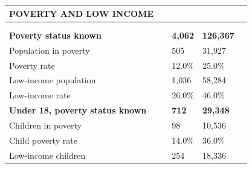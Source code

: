 \documentclass[9pt]{report}
\begin{document}
\vspace{12pt}
\setlength{\tabcolsep}{.01in} %
\begin{tabular}{p{.10in}p{.10in}p{.10in}p{3.7in}>{\hfill}p{.85in}>{\hfill}p{.85in}>{\hfill}p{.85in}>{\hfill}p{.85in}p{0.1in}}
\multicolumn{9}{l}{\parbox{7.1in}{\raggedright{\large{\strut\textbf{POVERTY AND LOW INCOME}\strut}}}} \\ 
\hline
\multicolumn{4}{l}{\parbox{3.5in}{\raggedright{\textbf{}}}} & \multicolumn{1}{r}{\parbox{.85in}{\strut\raggedleft{\textbf{}\strut}}} & \multicolumn{1}{r}{\parbox{.85in}{\strut\raggedleft{\textbf{}\strut}}} & \multicolumn{1}{r}{\parbox{.85in}{\strut{}}} & \multicolumn{1}{r}{\parbox{.85in}{\strut{}}} & \\ 
\multicolumn{9}{l}{} \\ 
\multicolumn{4}{l}{\parbox{3.5in}{\strut\raggedright{\textbf{Poverty status known}\strut}}} & \textbf{} & \textbf{} & \textbf{4,062} & \textbf{126,367} & \textbf{} \\ 
\multicolumn{4}{l}{\parbox{3.6in}{\strut\raggedright{{Population in poverty}}\strut}} &  &  & 505 & 31,927 & \multicolumn{1}{l}{}  \\ 
\multicolumn{4}{l}{\parbox{3.6in}{\strut\raggedright{{Poverty rate}}\strut}} &  &  & 12.0\% & 25.0\% & \multicolumn{1}{l}{}  \\ 
\multicolumn{4}{l}{\parbox{3.6in}{\strut\raggedright{{Low-income population}}\strut}} &  &  & 1,036 & 58,284 & \multicolumn{1}{l}{}  \\ 
\multicolumn{4}{l}{\parbox{3.6in}{\strut\raggedright{{Low-income rate}}\strut}} &  &  & 26.0\% & 46.0\% & \multicolumn{1}{l}{}  \\ 
\multicolumn{4}{l}{\parbox{3.5in}{\strut\raggedright{\textbf{Under 18, poverty status known}\strut}}} & \textbf{} & \textbf{} & \textbf{712} & \textbf{29,348} & \textbf{} \\ 
\multicolumn{4}{l}{\parbox{3.6in}{\strut\raggedright{{Children in poverty}}\strut}} &  &  & 98 & 10,536 & \multicolumn{1}{l}{}  \\ 
\multicolumn{4}{l}{\parbox{3.6in}{\strut\raggedright{{Child poverty rate}}\strut}} &  &  & 14.0\% & 36.0\% & \multicolumn{1}{l}{}  \\ 
\multicolumn{4}{l}{\parbox{3.6in}{\strut\raggedright{{Low-income children}}\strut}} &  &  & 254 & 18,336 & \multicolumn{1}{l}{}  \\ 

\end{tabular}
\end{document}
